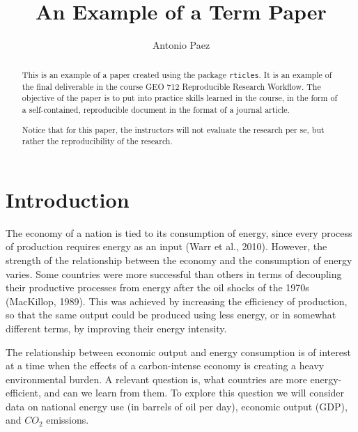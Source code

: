 \documentclass[]{elsarticle} %
\begin{document}
\begin{frontmatter}

  \title{An Example of a Term Paper}
    \author[School of Geography and Earth Sciences]{Antonio Paez}
      \address[School of Geography and Earth Sciences]{McMaster University, 1280 Main St W, Hamilton, ON, L8S 4K1 Canada}
  
  \begin{abstract}
  This is an example of a paper created using the package
  \texttt{rticles}. It is an example of the final deliverable in the
  course GEO 712 Reproducible Research Workflow. The objective of the
  paper is to put into practice skills learned in the course, in the form
  of a self-contained, reproducible document in the format of a journal
  article.
  
  Notice that for this paper, the instructors will not evaluate the
  research per se, but rather the reproducibility of the research.
  \end{abstract}
  
 \end{frontmatter}

\hypertarget{introduction}{%
\section{Introduction}\label{introduction}}

The economy of a nation is tied to its consumption of energy, since
every process of production requires energy as an input (Warr et al.,
2010). However, the strength of the relationship between the economy and
the consumption of energy varies. Some countries were more successful
than others in terms of decoupling their productive processes from
energy after the oil shocks of the 1970s (MacKillop, 1989). This was
achieved by increasing the efficiency of production, so that the same
output could be produced using less energy, or in somewhat different
terms, by improving their energy intensity.

The relationship between economic output and energy consumption is of
interest at a time when the effects of a carbon-intense economy is
creating a heavy environmental burden. A relevant question is, what
countries are more energy-efficient, and can we learn from them. To
explore this question we will consider data on national energy use (in
barrels of oil per day), economic output (GDP), and \(CO_2\) emissions.
\end{document}
